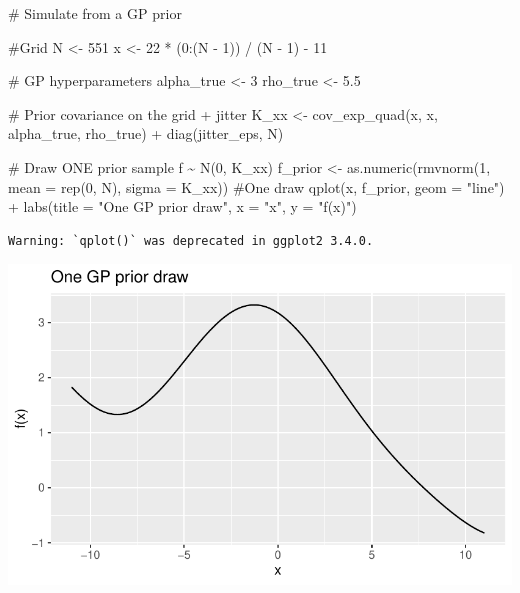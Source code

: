 \documentclass[
  letterpaper,
  DIV=11,
  numbers=noendperiod]{scrartcl}
\newenvironment{Shaded}{\begin{snugshade}}{\end{snugshade}}
\newcommand{\AttributeTok}[1]{\textcolor[rgb]{0.40,0.45,0.13}{#1}}
\newcommand{\CommentTok}[1]{\textcolor[rgb]{0.37,0.37,0.37}{#1}}
\newcommand{\DecValTok}[1]{\textcolor[rgb]{0.68,0.00,0.00}{#1}}
\newcommand{\FloatTok}[1]{\textcolor[rgb]{0.68,0.00,0.00}{#1}}
\newcommand{\FunctionTok}[1]{\textcolor[rgb]{0.28,0.35,0.67}{#1}}
\newcommand{\NormalTok}[1]{\textcolor[rgb]{0.00,0.23,0.31}{#1}}
\newcommand{\OtherTok}[1]{\textcolor[rgb]{0.00,0.23,0.31}{#1}}
\newcommand{\SpecialCharTok}[1]{\textcolor[rgb]{0.37,0.37,0.37}{#1}}
\newcommand{\StringTok}[1]{\textcolor[rgb]{0.13,0.47,0.30}{#1}}
\begin{document}
\begin{Shaded}
\begin{Highlighting}[]
\CommentTok{\# Simulate from a GP prior}

\CommentTok{\#Grid}
\NormalTok{N  }\OtherTok{\textless{}{-}} \DecValTok{551}
\NormalTok{x  }\OtherTok{\textless{}{-}} \DecValTok{22} \SpecialCharTok{*}\NormalTok{ (}\DecValTok{0}\SpecialCharTok{:}\NormalTok{(N }\SpecialCharTok{{-}} \DecValTok{1}\NormalTok{)) }\SpecialCharTok{/}\NormalTok{ (N }\SpecialCharTok{{-}} \DecValTok{1}\NormalTok{) }\SpecialCharTok{{-}} \DecValTok{11}

\CommentTok{\# GP hyperparameters }
\NormalTok{alpha\_true }\OtherTok{\textless{}{-}} \DecValTok{3}
\NormalTok{rho\_true   }\OtherTok{\textless{}{-}} \FloatTok{5.5}

\CommentTok{\# Prior covariance on the grid + jitter}
\NormalTok{K\_xx }\OtherTok{\textless{}{-}} \FunctionTok{cov\_exp\_quad}\NormalTok{(x, x, alpha\_true, rho\_true) }\SpecialCharTok{+} \FunctionTok{diag}\NormalTok{(jitter\_eps, N)}

\CommentTok{\# Draw ONE prior sample f \textasciitilde{} N(0, K\_xx)}
\NormalTok{f\_prior }\OtherTok{\textless{}{-}} \FunctionTok{as.numeric}\NormalTok{(}\FunctionTok{rmvnorm}\NormalTok{(}\DecValTok{1}\NormalTok{, }\AttributeTok{mean =} \FunctionTok{rep}\NormalTok{(}\DecValTok{0}\NormalTok{, N), }\AttributeTok{sigma =}\NormalTok{ K\_xx))}
\CommentTok{\#One draw}
\FunctionTok{qplot}\NormalTok{(x, f\_prior, }\AttributeTok{geom =} \StringTok{"line"}\NormalTok{) }\SpecialCharTok{+}
  \FunctionTok{labs}\NormalTok{(}\AttributeTok{title =} \StringTok{"One GP prior draw"}\NormalTok{, }\AttributeTok{x =} \StringTok{"x"}\NormalTok{, }\AttributeTok{y =} \StringTok{"f(x)"}\NormalTok{)}
\end{Highlighting}
\end{Shaded}

\begin{verbatim}
Warning: `qplot()` was deprecated in ggplot2 3.4.0.
\end{verbatim}

\includegraphics{GP-simulation-+-inference_files/figure-pdf/unnamed-chunk-2-1.pdf}
\end{document}
